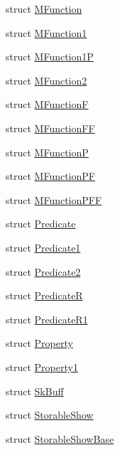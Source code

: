 \begin{DoxyCompactItemize}
\item 
struct \hyperlink{structpfq_1_1lang_1_1MFunction}{M\+Function}
\item 
struct \hyperlink{structpfq_1_1lang_1_1MFunction1}{M\+Function1}
\item 
struct \hyperlink{structpfq_1_1lang_1_1MFunction1P}{M\+Function1\+P}
\item 
struct \hyperlink{structpfq_1_1lang_1_1MFunction2}{M\+Function2}
\item 
struct \hyperlink{structpfq_1_1lang_1_1MFunctionF}{M\+Function\+F}
\item 
struct \hyperlink{structpfq_1_1lang_1_1MFunctionFF}{M\+Function\+F\+F}
\item 
struct \hyperlink{structpfq_1_1lang_1_1MFunctionP}{M\+Function\+P}
\item 
struct \hyperlink{structpfq_1_1lang_1_1MFunctionPF}{M\+Function\+P\+F}
\item 
struct \hyperlink{structpfq_1_1lang_1_1MFunctionPFF}{M\+Function\+P\+F\+F}
\item 
struct \hyperlink{structpfq_1_1lang_1_1Predicate}{Predicate}
\item 
struct \hyperlink{structpfq_1_1lang_1_1Predicate1}{Predicate1}
\item 
struct \hyperlink{structpfq_1_1lang_1_1Predicate2}{Predicate2}
\item 
struct \hyperlink{structpfq_1_1lang_1_1PredicateR}{Predicate\+R}
\item 
struct \hyperlink{structpfq_1_1lang_1_1PredicateR1}{Predicate\+R1}
\item 
struct \hyperlink{structpfq_1_1lang_1_1Property}{Property}
\item 
struct \hyperlink{structpfq_1_1lang_1_1Property1}{Property1}
\item 
struct \hyperlink{structpfq_1_1lang_1_1SkBuff}{Sk\+Buff}
\item 
struct \hyperlink{structpfq_1_1lang_1_1StorableShow}{Storable\+Show}
\item 
struct \hyperlink{structpfq_1_1lang_1_1StorableShowBase}{Storable\+Show\+Base}
\end{DoxyCompactItemize}
